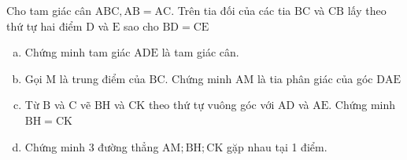\begin{bt}
    Cho tam giác cân $\mathrm{ABC}, \mathrm{AB}=\mathrm{AC}$. Trên tia đối của các tia $\mathrm{BC}$ và $\mathrm{CB}$ lấy theo thứ tự hai điểm $\mathrm{D}$ và $\mathrm{E}$ sao cho $\mathrm{BD}=\mathrm{CE}$
    \begin{enumerate}[a.]
        \item Chứng minh tam giác $\mathrm{ADE}$ là tam giác cân.
        \item Gọi $\mathrm{M}$ là trung điểm của $\mathrm{BC}$. Chứng minh $\mathrm{AM}$ là tia phân giác của góc $\mathrm{DAE}$
        \item Từ $\mathrm{B}$ và $\mathrm{C}$ vẽ $\mathrm{BH}$ và $\mathrm{CK}$ theo thứ tự vuông góc với $\mathrm{AD}$ và $\mathrm{AE}$. Chứng minh $\mathrm{BH}=\mathrm{CK}$
        \item Chứng minh 3 đường thẳng $\mathrm{AM} ; \mathrm{BH} ; \mathrm{CK}$ gặp nhau tại 1 điểm.
    \end{enumerate}
\end{bt}

